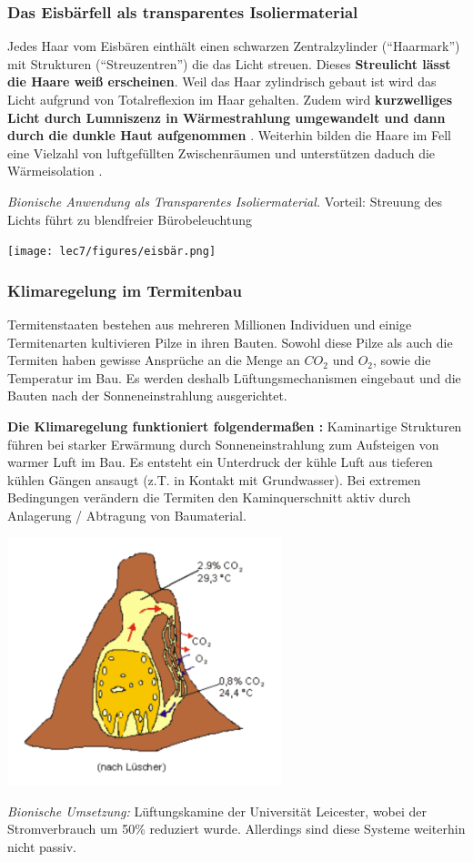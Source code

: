 \subsubsection{Das Eisbärfell als transparentes Isoliermaterial}

Jedes Haar vom Eisbären einthält einen schwarzen Zentralzylinder (``Haarmark'') mit Strukturen (``Streuzentren'') die das Licht streuen. Dieses \textbf{Streulicht lässt die Haare weiß erscheinen}. Weil das Haar zylindrisch gebaut ist wird das Licht aufgrund von Totalreflexion im Haar gehalten. Zudem wird \textbf{kurzwelliges Licht durch Lumniszenz in Wärmestrahlung umgewandelt und dann durch die dunkle Haut aufgenommen} \dangersign. Weiterhin bilden die Haare im Fell eine Vielzahl von luftgefüllten Zwischenräumen
und unterstützen daduch die Wärmeisolation \dangersign.

\textit{Bionische Anwendung als Transparentes Isoliermaterial.} Vorteil:
Streuung des Lichts führt zu blendfreier Bürobeleuchtung

\begin{center}
    \texttt{[image: lec7/figures/eisbär.png]}
\end{center}

\subsubsection{Klimaregelung im Termitenbau}

Termitenstaaten bestehen aus mehreren Millionen Individuen und einige Termitenarten kultivieren Pilze in ihren Bauten. Sowohl diese Pilze als auch die Termiten haben gewisse Ansprüche an die Menge an $CO_2$ und $O_2$, sowie die Temperatur im Bau. Es werden deshalb Lüftungsmechanismen eingebaut und die Bauten nach der Sonneneinstrahlung ausgerichtet. 

\textbf{Die Klimaregelung funktioniert folgendermaßen \dangersign:} Kaminartige Strukturen
führen bei starker Erwärmung durch Sonneneinstrahlung zum Aufsteigen von warmer Luft im Bau. Es entsteht ein Unterdruck der kühle Luft aus tieferen kühlen Gängen ansaugt (z.T. in Kontakt mit Grundwasser). Bei extremen Bedingungen verändern die Termiten den Kaminquerschnitt aktiv durch Anlagerung / Abtragung von Baumaterial.

\begin{center}
    \includegraphics[width=8cm]{lec7/figures/termiten.png}
\end{center}
\textit{Bionische Umsetzung:} Lüftungskamine der Universität Leicester, wobei der Stromverbrauch um 50\% reduziert wurde. Allerdings sind diese Systeme weiterhin nicht passiv.
 

